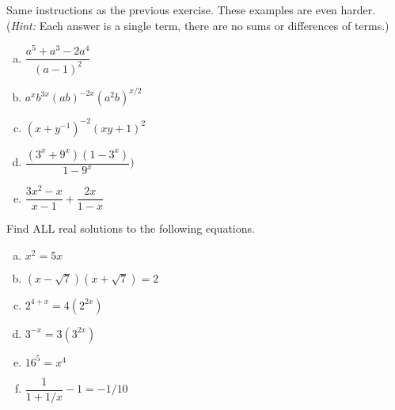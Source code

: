\begin{exercise}\label{exercise:BeforeWeBegin:9}
Same instructions as the previous exercise. These examples are even harder. (\emph{Hint:} Each answer is a single term, there are no sums or differences of terms.)
\begin{multicols}{2}
\begin{enumerate}[(a)]
\item
$\dfrac{a^5 +a^3 - 2a^4}{(a-1)^2}$
\item
$a^x b^{3x}(ab)^{-2x}(a^2 b)^{x/2}$
\item
$(x+y^{-1})^{-2}(xy+1)^2$
\item
$\dfrac{(3^x+9^x)(1-3^x)}{1-9^x})$
\item
$\dfrac{3x^2 - x}{x-1} + \dfrac{2x}{1-x}$

\end{enumerate}
\end{multicols}
\end{exercise}

\begin{exercise}\label{exercise:BeforeWeBegin:10}
Find ALL  real solutions to the following equations. 
\begin{multicols}{2}
\begin{enumerate}[(a)]
\item
$x^2 = 5x$
\item
$(x - \sqrt{7})(x+\sqrt{7}) = 2$
\item
$2^{4+x} = 4(2^{2x})$
\item
$3^{-x} = 3(3^{2x})$
\item
$16^5 = x^4$
\item
$\dfrac{1}{1 + 1/x} -1= -1/10$
\end{enumerate}
\end{multicols}
\end{exercise}